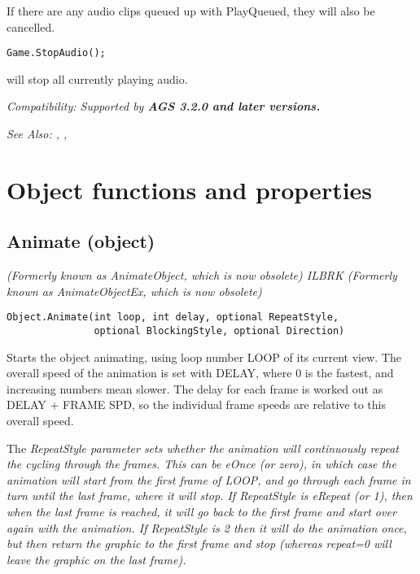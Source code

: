 If there are any audio clips queued up with PlayQueued, they will also be cancelled.

\begin{verbatim}
Game.StopAudio();
\end{verbatim}
will stop all currently playing audio.

\it{Compatibility:} Supported by \bf{AGS 3.2.0} and later versions.

\it{See Also:} , ,


\section{Object functions and properties}%


\subsection{Animate (object)}\label{Object.Animate}%

\it{(Formerly known as AnimateObject, which is now obsolete)} ILBRK
\it{(Formerly known as AnimateObjectEx, which is now obsolete)}

\begin{verbatim}
Object.Animate(int loop, int delay, optional RepeatStyle,
               optional BlockingStyle, optional Direction)
\end{verbatim}
Starts the object animating, using loop number LOOP of its current view.
The overall speed of the animation is set with DELAY, where 0 is the
fastest, and increasing numbers mean slower. The delay for each frame
is worked out as DELAY + FRAME SPD, so the individual frame speeds are
relative to this overall speed.

The \it{RepeatStyle} parameter sets whether the animation will continuously repeat
the cycling through the frames. This can be \it{eOnce} (or zero), in which case the animation
will start from the first frame of LOOP, and go through each frame in turn until the
last frame, where it will stop. If RepeatStyle is \it{eRepeat} (or 1), then when the last frame
is reached, it will go back to the first frame and start over again with the animation.
If RepeatStyle is 2 then it will do the animation once, but then return
the graphic to the first frame and stop (whereas repeat=0 will leave the
graphic on the last frame).

